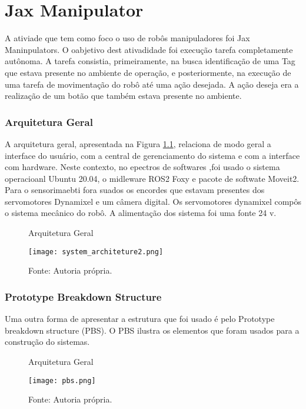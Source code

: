 \chapter{Jax Manipulator}
\label{chap:metod}
A ativiade que tem como foco o uso de robôs manipuladores foi Jax Maninpulators. O oabjetivo dest ativadidade foi execução tarefa completamente autônoma. A tarefa consistia, primeiramente, na busca identificação de uma Tag que estava presente no ambiente de operação, e posteriormente, na execução de uma tarefa de movimentação do robô até uma  ação desejada. A ação deseja era a realização de um botão que também estava presente no ambiente.



\subsection{Arquitetura Geral}
 A arquitetura geral, apresentada na Figura \ref{fig:Arquitetura geral}, relaciona de modo geral a interface do usuário, com a central de gerenciamento do sistema e com a interface com hardware. Neste contexto, no epectros de softwares  ,foi usado o sistema operacioanl Ubuntu 20.04, o midleware ROS2 Foxy  e pacote de softwate Moveit2. Para o sensorimaebti fora suados os encordes que estavam presentes dos servomotores Dynamixel e um câmera digital. Os servomotores dynamixel compôs o sistema mecânico do robô.  A alimentação dos sistema foi uma fonte 24 v.

 \begin{figure} [h!]	
    \centering

    \caption{Arquitetura Geral}
    \texttt{[image: system\_architeture2.png]}
    \caption*{Fonte: Autoria própria.}
    \label{fig:Arquitetura geral}
\end{figure}	


\subsection{Prototype Breakdown Structure}

Uma outra forma de apresentar a estrutura que foi usado é pelo  Prototype breakdown structure (PBS). O PBS ilustra os elementos que foram usados para a construção do sistemas.




\begin{figure} [h!]	
    \centering

    \caption{Arquitetura Geral}
    \texttt{[image: pbs.png]}
    \caption*{Fonte: Autoria própria.}
    \label{fig:PBS}
\end{figure}	

